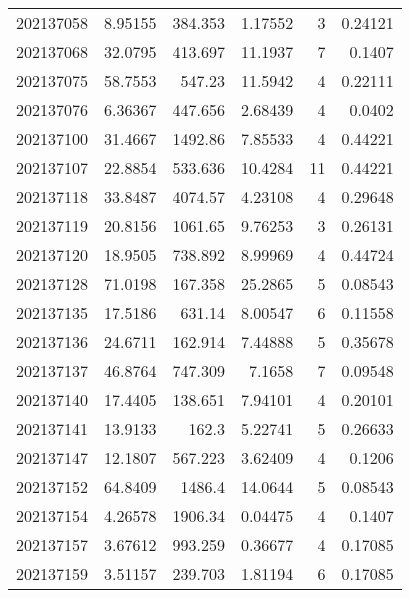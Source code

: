 \begin{tabular}{rrrrrr}
 202137058 &          8.95155 &      384.353  &            1.17552 &           3 & 0.24121 \\
 202137068 &         32.0795  &      413.697  &           11.1937  &           7 & 0.1407  \\
 202137075 &         58.7553  &      547.23   &           11.5942  &           4 & 0.22111 \\
 202137076 &          6.36367 &      447.656  &            2.68439 &           4 & 0.0402  \\
 202137100 &         31.4667  &     1492.86   &            7.85533 &           4 & 0.44221 \\
 202137107 &         22.8854  &      533.636  &           10.4284  &          11 & 0.44221 \\
 202137118 &         33.8487  &     4074.57   &            4.23108 &           4 & 0.29648 \\
 202137119 &         20.8156  &     1061.65   &            9.76253 &           3 & 0.26131 \\
 202137120 &         18.9505  &      738.892  &            8.99969 &           4 & 0.44724 \\
 202137128 &         71.0198  &      167.358  &           25.2865  &           5 & 0.08543 \\
 202137135 &         17.5186  &      631.14   &            8.00547 &           6 & 0.11558 \\
 202137136 &         24.6711  &      162.914  &            7.44888 &           5 & 0.35678 \\
 202137137 &         46.8764  &      747.309  &            7.1658  &           7 & 0.09548 \\
 202137140 &         17.4405  &      138.651  &            7.94101 &           4 & 0.20101 \\
 202137141 &         13.9133  &      162.3    &            5.22741 &           5 & 0.26633 \\
 202137147 &         12.1807  &      567.223  &            3.62409 &           4 & 0.1206  \\
 202137152 &         64.8409  &     1486.4    &           14.0644  &           5 & 0.08543 \\
 202137154 &          4.26578 &     1906.34   &            0.04475 &           4 & 0.1407  \\
 202137157 &          3.67612 &      993.259  &            0.36677 &           4 & 0.17085 \\
 202137159 &          3.51157 &      239.703  &            1.81194 &           6 & 0.17085 \\

\end{tabular}
